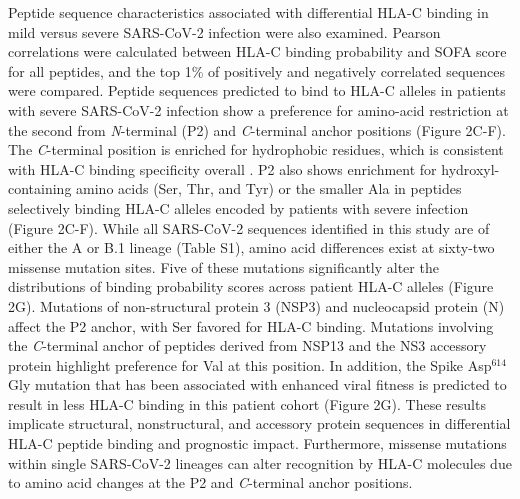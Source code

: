 \documentclass[utf8]{frontiersinFPHY_FAMS} %
\begin{document}
 Peptide sequence characteristics associated with differential HLA-C binding in mild versus severe SARS-CoV-2 infection were also examined. Pearson correlations were calculated between HLA-C binding probability and SOFA score for all peptides, and the top 1\% of positively and negatively correlated sequences were compared. Peptide sequences predicted to bind to HLA-C alleles in patients with severe SARS-CoV-2 infection show a preference for amino-acid restriction at the second from \textit{N}-terminal (P2) and \textit{C}-terminal anchor positions (Figure 2C-F). The \textit{C}-terminal position is enriched for hydrophobic residues, which is consistent with HLA-C binding specificity overall \citep{25311805}. P2 also shows enrichment for hydroxyl-containing amino acids (Ser, Thr, and Tyr) or the smaller Ala in peptides selectively binding HLA-C alleles encoded by patients with severe infection (Figure 2C-F). While all SARS-CoV-2 sequences identified in this study are of either the A or B.1 lineage (Table S1), amino acid differences exist at sixty-two missense mutation sites. Five of these mutations significantly alter the distributions of binding probability scores across patient HLA-C alleles (Figure 2G). Mutations of non-structural protein 3 (NSP3) and nucleocapsid protein (N) affect the P2 anchor, with Ser favored for HLA-C binding. Mutations involving the \textit{C}-terminal anchor of peptides derived from NSP13 and the NS3 accessory protein highlight preference for Val at this position. In addition, the Spike Asp$^{614}$Gly mutation that has been associated with enhanced viral fitness is predicted to result in less HLA-C binding in this patient cohort (Figure 2G). These results implicate structural, nonstructural, and accessory protein sequences in differential HLA-C peptide binding and prognostic impact. Furthermore, missense mutations within single SARS-CoV-2 lineages can alter recognition by HLA-C molecules due to amino acid changes at the P2 and \textit{C}-terminal anchor positions.
 
\end{document}
